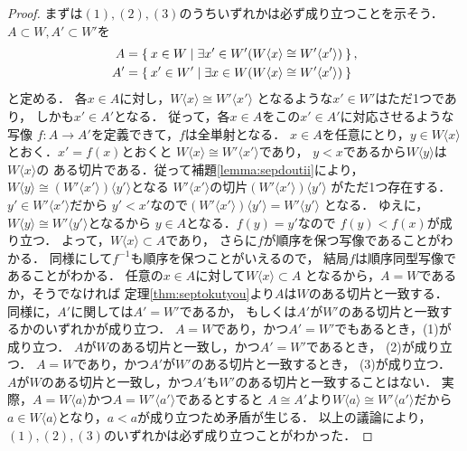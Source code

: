   \begin{proof}
    まずは$(1),(2),(3)$のうちいずれかは必ず成り立つことを示そう．
    $A \subset W, A' \subset W'$を
    \begin{align*}
      A & = \Set{ x \in W \mid \exists x' \in W' (W \langle x \rangle 
      \cong W' \langle x' \rangle )}, \\
      A'& = \Set{ x' \in W' \mid \exists x \in W (W \langle x \rangle 
      \cong W' \langle x' \rangle)}
    \end{align*}
    と定める．
    各$x \in A$に対し，$W \langle x \rangle \cong W' \langle x' \rangle$
    となるような$x' \in W'$はただ1つであり，
    しかも$x' \in A'$となる．
    従って，各$x \in A$をこの$x' \in A'$に対応させるような写像
    $f:A \longrightarrow A'$を定義できて，$f$は全単射となる．
    $x \in A$を任意にとり，$y \in W \langle x \rangle$
    とおく．$x' = f(x)$とおくと
    $W \langle x \rangle \cong W' \langle x' \rangle$であり，
    $y<x$であるから$W \langle y \rangle$は$W \langle x \rangle$の
    ある切片である．従って補題\ref{lemma:sepdoutii}により，
    $W \langle y \rangle \cong (W' \langle x' \rangle ) \langle y' \rangle$となる
    $W' \langle x' \rangle$の切片$(W' \langle x' \rangle ) \langle y' \rangle $
    がただ1つ存在する．$y' \in W' \langle x'\rangle$だから
    $y'< x'$なので$(W' \langle x' \rangle) \langle y' \rangle = W' \langle y' \rangle$
    となる．
    ゆえに，$W \langle y \rangle \cong W' \langle y' \rangle$となるから
    $y \in A$となる．$f(y) = y'$なので
    $f(y) < f(x)$が成り立つ．
    よって，$W \langle x \rangle \subset A$であり，
    さらに$f$が順序を保つ写像であることがわかる．
    同様にして$f^{-1}$も順序を保つことがいえるので，
    結局$f$は順序同型写像であることがわかる．
    任意の$x \in A$に対して$W \langle x \rangle \subset A$
    となるから，$A=W$であるか，そうでなければ
    定理\ref{thm:septokutyou}より$A$は$W$のある切片と一致する．
    同様に，$A'$に関しては$A'=W'$であるか，
    もしくは$A'$が$W'$のある切片と一致するかのいずれかが成り立つ．
    $A=W$であり，かつ$A'=W'$でもあるとき，(1)が成り立つ．
    $A$が$W$のある切片と一致し，かつ$A'=W'$であるとき，
    (2)が成り立つ．
    $A=W$であり，かつ$A'$が$W'$のある切片と一致するとき，
    (3)が成り立つ．
    $A$が$W$のある切片と一致し，かつ$A'$も$W'$のある切片と一致することはない．
    実際，$A= W \langle a \rangle$かつ$A=W' \langle a' \rangle$であるとすると
    $A \cong A'$より$W \langle a \rangle \cong W' \langle a' \rangle$だから
    $a \in W \langle a \rangle$となり，$a < a$が成り立つため矛盾が生じる．
    以上の議論により，$(1),(2),(3)$のいずれかは必ず成り立つことがわかった．




\end{proof}
